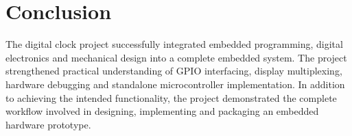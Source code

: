 \documentclass[11pt,a4paper]{report}
\begin{document}

\section{Conclusion}

The digital clock project successfully integrated embedded programming, digital electronics and mechanical design into a complete embedded system. The project strengthened practical understanding of GPIO interfacing, display multiplexing, hardware debugging and standalone microcontroller implementation. In addition to achieving the intended functionality, the project demonstrated the complete workflow involved in designing, implementing and packaging an embedded hardware prototype.
\end{document}
